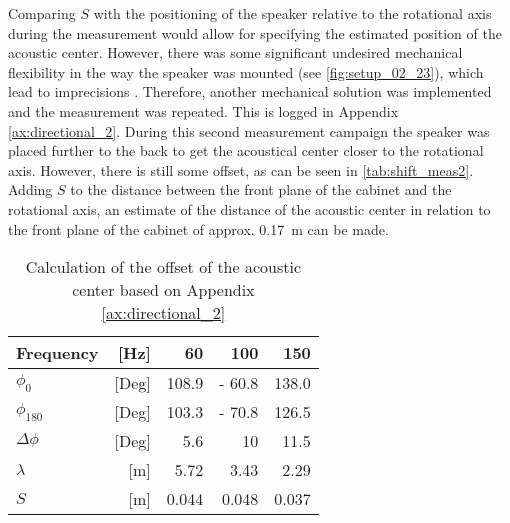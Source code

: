 Comparing \(S\) with the positioning of the speaker relative to the rotational axis during the measurement would allow for specifying the estimated position of the acoustic center. However, there was some significant undesired mechanical flexibility in the way the speaker was mounted (see \autoref{fig:setup_02_23}), which lead to imprecisions . Therefore, another mechanical solution was implemented and the measurement was repeated. This is  logged in Appendix \ref{ax:directional_2}.
During this second measurement campaign the speaker was placed further to the back to get the acoustical center closer to the rotational axis. However, there is still some offset, as can be seen in \autoref{tab:shift_meas2}.
Adding \(S\) to the distance between the front plane of the cabinet and the rotational axis, an estimate of the distance of the acoustic center in relation to the front plane of the cabinet of approx. \SI{0.17}{\meter} can be made. 
\begin{table}[H]
\centering
\caption{Calculation of the offset of the acoustic center based on Appendix \ref{ax:directional_2}}
\label{tab:shift_meas2}
\begin{tabular}{|lr|r|r|r|}
\hline
Frequency              & {[}Hz{]}  & 60    & 100    & 150   \\ \hline
\(\phi_0\)             & {[}Deg{]} & 108.9 & - 60.8 & 138.0 \\ \hline
\(\phi_{180}\)         & {[}Deg{]} & 103.3 & - 70.8 & 126.5 \\ \hline
\(\Delta\phi\)         & {[}Deg{]} & 5.6   & 10     & 11.5  \\ \hline
\(\lambda\)            & {[}m{]}   & 5.72  & 3.43   & 2.29  \\ \hline
\(S\)                  & {[}m{]}   & 0.044 & 0.048  & 0.037 \\ \hline
\end{tabular}
\end{table}

